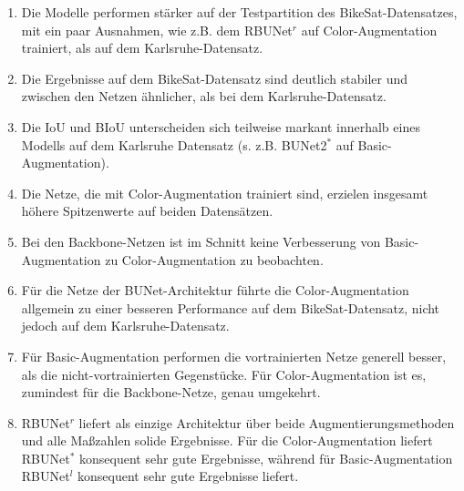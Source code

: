 \begin{enumerate}
	\item Die Modelle performen stärker auf der Testpartition des BikeSat-Datensatzes, mit ein paar Ausnahmen, wie z.B. dem RBUNet$^r$ auf Color-Augmentation trainiert, 
	als auf dem Karlsruhe-Datensatz. 
	\item Die Ergebnisse auf dem BikeSat-Datensatz sind deutlich stabiler und zwischen den Netzen ähnlicher, als bei dem Karlsruhe-Datensatz.
	\item Die \ac{IoU} und \ac{BIoU} unterscheiden sich teilweise markant innerhalb eines Modells auf dem Karlsruhe Datensatz (s. z.B. BUNet2$^*$ auf Basic-Augmentation).
	\item Die Netze, die mit Color-Augmentation trainiert sind, erzielen insgesamt höhere Spitzenwerte auf beiden Datensätzen. 
	\item Bei den Backbone-Netzen ist im Schnitt keine Verbesserung von Basic-Augmentation zu Color-Augmentation zu beobachten. 
	\item Für die Netze der BUNet-Architektur führte die Color-Augmentation allgemein zu einer besseren Performance auf dem BikeSat-Datensatz, nicht jedoch auf dem Karlsruhe-Datensatz.
	\item Für Basic-Augmentation performen die vortrainierten Netze generell besser, als die nicht-vortrainierten Gegenstücke. 
	Für Color-Augmentation ist es, zumindest für die Backbone-Netze, genau umgekehrt. 
	\item RBUNet$^r$ liefert als einzige Architektur über beide Augmentierungsmethoden und alle Maßzahlen solide Ergebnisse. 
	Für die Color-Augmentation liefert RBUNet$^*$ konsequent sehr gute Ergebnisse, während für Basic-Augmentation RBUNet$^l$ konsequent sehr gute Ergebnisse liefert.
\end{enumerate}


